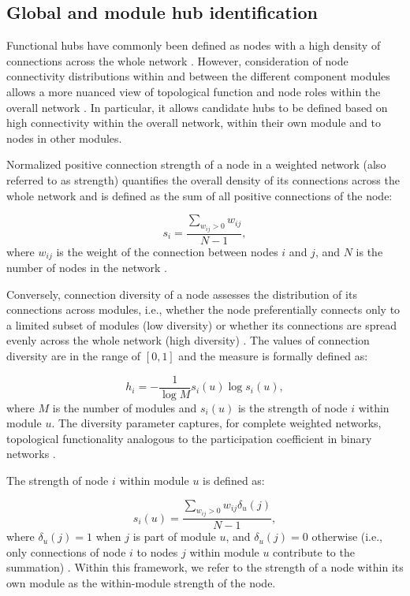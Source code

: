 \subsection{Global and module hub identification}
Functional hubs have commonly been defined as nodes with a high density of
connections across the whole network \parencite{bullmore2009}. However,
consideration of node connectivity distributions within and between the
different component modules allows a more nuanced view of topological function
and node roles within the overall network \parencite{guimera2005,
vandenheuvel2013, zuo2012}. In particular, it allows candidate hubs to be
defined based on high connectivity within the overall network, within their own
module and to nodes in other modules.

Normalized positive connection strength of a node in a weighted network (also
referred to as strength) quantifies the overall density of its connections
across the whole network and is defined as the sum of all positive connections
of the node:

$$s_i =  \frac{\sum_{w_{ij}>0} w_{ij}}{N-1},$$
where $w_{ij}$ is the weight of the connection between nodes $i$ and $j$, and
$N$ is the number of nodes in the network \parencite{rubinov2011}.

Conversely, connection diversity of a node assesses the distribution of its
connections across modules, i.e., whether the node preferentially connects only
to a limited subset of modules (low diversity) or whether its connections are
spread evenly across the whole network (high diversity) \parencite{rubinov2011}.
The values of connection diversity are in the range of $[0,1]$ and the measure
is formally defined as:

$$h_i = - \frac{1}{\log M} s_i(u) \log{s_i(u)},$$
where $M$ is the number of modules and $s_i(u)$ is the strength of node $i$
within module $u$. The diversity parameter captures, for complete weighted
networks, topological functionality analogous to the participation coefficient
in binary networks \parencite{guimera2005}.

The strength of node $i$ within module $u$ is defined as: 

$$s_i(u) = \frac{\sum_{w_{ij}>0} w_{ij} \delta_u(j)}{N-1},$$
where $\delta_u (j)=1$ when $j$ is part of module $u$, and $\delta_u(j) = 0$
otherwise (i.e., only connections of node $i$ to nodes $j$ within module $u$
contribute to the summation) \parencite{rubinov2011}. Within this framework, we
refer to the strength of a node within its own module as the within-module
strength of the node. 

